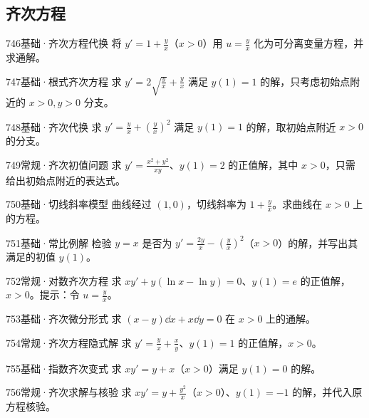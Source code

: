 \subsection{齐次方程}
\begin{exercise}{746}{基础·齐次方程代换}
将 $y'=1+\frac{y}{x}$（$x>0$）用 $u=\frac{y}{x}$ 化为可分离变量方程，并求通解。
\end{exercise}
\begin{exercise}{747}{基础·根式齐次方程}
求 $y'=2\sqrt{\frac{y}{x}}+\frac{y}{x}$ 满足 $y(1)=1$ 的解，只考虑初始点附近的 $x>0,y>0$ 分支。
\end{exercise}
\begin{exercise}{748}{基础·齐次代换}
求 $y'=\frac{y}{x}+(\frac{y}{x})^2$ 满足 $y(1)=1$ 的解，取初始点附近 $x>0$ 的分支。
\end{exercise}
\begin{exercise}{749}{常规·齐次初值问题}
求 $y'=\frac{x^2+y^2}{xy}$、$y(1)=2$ 的正值解，其中 $x>0$，只需给出初始点附近的表达式。
\end{exercise}
\begin{exercise}{750}{基础·切线斜率模型}
曲线经过 $(1,0)$，切线斜率为 $1+\frac{y}{x}$。求曲线在 $x>0$ 上的方程。
\end{exercise}
\begin{exercise}{751}{基础·常比例解}
检验 $y=x$ 是否为 $y'=\frac{2y}{x}-(\frac{y}{x})^2$（$x>0$）的解，并写出其满足的初值 $y(1)$。
\end{exercise}
\begin{exercise}{752}{常规·对数齐次方程}
求 $xy'+y(\ln x-\ln y)=0$、$y(1)=e$ 的正值解，$x>0$。提示：令 $u=\frac{y}{x}$。
\end{exercise}
\begin{exercise}{753}{基础·齐次微分形式}
求 $(x-y)\dd x+x\dd y=0$ 在 $x>0$ 上的通解。
\end{exercise}
\begin{exercise}{754}{常规·齐次方程隐式解}
求 $y'=\frac{y}{x}+\frac{x}{y}$、$y(1)=1$ 的正值解，$x>0$。
\end{exercise}
\begin{exercise}{755}{基础·指数齐次变式}
求 $xy'=y+x$（$x>0$）满足 $y(1)=0$ 的解。
\end{exercise}
\begin{exercise}{756}{常规·齐次求解与核验}
求 $xy'=y+\frac{y^2}{x}$（$x>0$）、$y(1)=-1$ 的解，并代入原方程核验。
\end{exercise}
